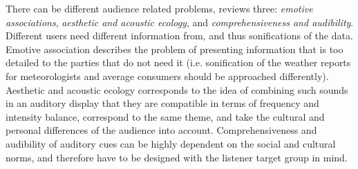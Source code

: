 There can be different audience related problems, \cite{hermann_sonification_2011} reviews three: \textit{emotive associations}, \textit{aesthetic and acoustic ecology}, and \textit{comprehensiveness and audibility}. Different users need different information from, and thus sonifications of the data. Emotive association describes the problem of presenting information that is too detailed to the parties that do not need it (i.e. sonification of the weather reports for meteorologists and average consumers should be approached differently). Aesthetic and acoustic ecology corresponds to the idea of combining such sounds in an auditory display that they are compatible in terms of frequency and intensity balance, correspond to the same theme, and take the cultural and personal differences of the audience into account. Comprehensiveness and audibility of auditory cues can be highly dependent on the social and cultural norms, and therefore have to be designed with the listener target group in mind.

\paragraph[Earcons and Auditory icons]{}


